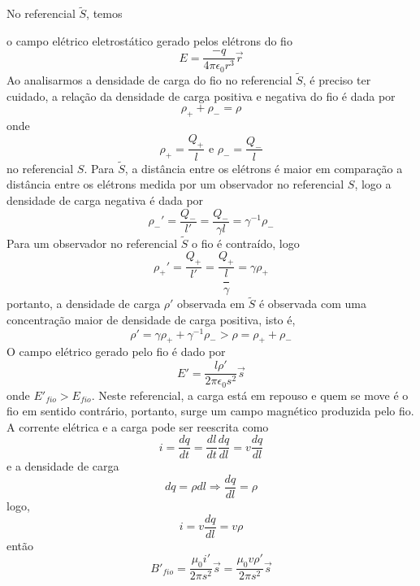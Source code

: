 \documentclass[10pt,a4paper]{article}
\begin{document}
\begin{enumerate}
\begin{enumerate}
		No referencial $\tilde{S}$, temos
		
		o campo elétrico eletrostático gerado pelos elétrons do fio
		\begin{equation*}
			E = \dfrac{-q}{4\pi \epsilon_0 r^3}\vec{r}
		\end{equation*}
		Ao analisarmos a densidade de carga do fio no referencial $\tilde{S}$, é preciso ter cuidado, a relação da densidade de carga positiva e negativa do fio é dada por
		\begin{equation*}
			\rho_+ +\rho_- = \rho
		\end{equation*}
		onde
		\begin{equation*}
			\rho_+ = \frac{Q_+}{l}\text{ e  } \rho_- = \frac{Q_-}{l}
		\end{equation*}
		no referencial $ S $.
		Para $\tilde{S}$, a distância entre os elétrons é maior em comparação a distância entre os elétrons medida por um observador no referencial $ S $, logo a densidade de carga negativa é dada por
		\begin{equation*}
			\rho_-'  = \dfrac{Q_-}{l'}=\dfrac{Q_-}{\gamma l} = \gamma^{-1} \rho_-
		\end{equation*}
		Para um observador no referencial $\tilde{S}$ o fio é contraído, logo
		\begin{equation*}
			\rho_+\prime = \dfrac{Q_+}{l\prime} = \dfrac{Q_+}{\dfrac{l}{\gamma}} = \gamma\rho_+
		\end{equation*}
		portanto, a densidade de carga $\rho\prime$ observada em $\tilde{S}$ é observada com uma concentração maior de densidade de carga positiva, isto é,
		\begin{equation*}
			\rho\prime = \gamma\rho_+ + \gamma^{-1}\rho_- > \rho = \rho_+ + \rho_-
		\end{equation*}
		O campo elétrico gerado pelo fio é dado por
		\begin{equation*}
			E' = \dfrac{l\rho\prime }{2\pi \epsilon_0s^2 }\vec{s}
		\end{equation*}
		onde $ E'_{fio} > E_{fio} $.
		Neste referencial, a carga está em repouso e quem se move é o fio em sentido contrário, portanto, surge um campo magnético produzida pelo fio. A corrente elétrica e a carga pode ser reescrita como 
		\begin{equation*}
			i = \dfrac{dq}{dt} = \dfrac{dl}{dt}\dfrac{dq}{dl} = v \dfrac{dq}{dl}
		\end{equation*}
		e a densidade de carga
		\begin{equation*}
			dq = \rho dl \Rightarrow \dfrac{dq}{dl} = \rho
		\end{equation*}
		logo,
		\begin{equation*}
			i = v\dfrac{dq}{dl} = v\rho
		\end{equation*}	
		então
		\begin{equation*}
			B'_{fio} = \dfrac{\mu_0 i\prime}{2\pi s^2}\vec{s} = \dfrac{\mu_0 v\rho\prime}{2\pi s^2}\vec{s}
		\end{equation*}
	

\end{enumerate}
\end{enumerate}
\end{document}
